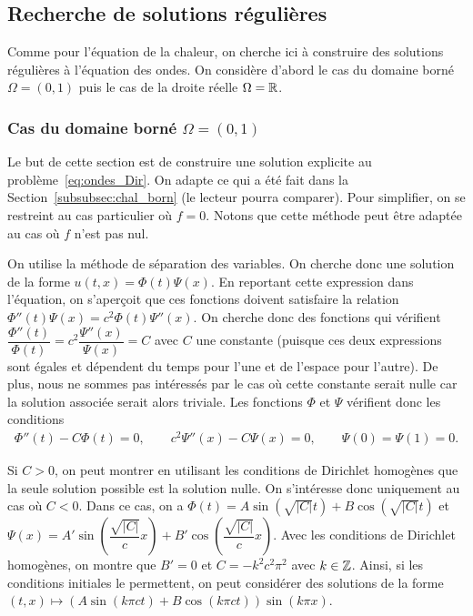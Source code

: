 \documentclass[12pt,a4paper,twoside]{article}
\begin{document}
\subsection{Recherche de solutions r\'eguli\`eres}

Comme pour l'\'equation de la chaleur, on cherche ici \`a construire des solutions
r\'eguli\`eres \`a l'\'equation des ondes.
On consid\`ere d'abord le cas du domaine born\'e $\Omega = (0,1)$
puis le cas de la droite r\'eelle $\Omega = \mathbb{R}$.

\subsubsection{Cas du domaine born\'e $\Omega = (0,1)$}

Le but de cette section est de construire une solution explicite au
probl\`eme~\eqref{eq:ondes_Dir}.
On adapte ce qui a \'et\'e fait dans la Section~\ref{subsubsec:chal_born}
(le lecteur pourra comparer).
Pour simplifier, on se restreint au cas particulier o\`u $f = 0$.
Notons que cette m\'ethode peut \^etre adapt\'ee au cas o\`u $f$ n'est pas nul.

On utilise la m\'ethode de s\'eparation des variables.
On cherche donc une solution de la forme $u(t,x) = \Phi(t) \Psi(x)$.
En reportant cette expression dans l'\'equation, on s'aper\c{c}oit 
que ces fonctions doivent satisfaire la relation
$\Phi''(t) \Psi(x) = c^2 \Phi(t) \Psi''(x)$.
On cherche donc des fonctions qui v\'erifient
$\dfrac{\Phi''(t)}{\Phi(t)} = c^2 \dfrac{\Psi''(x)}{\Psi(x)} = C$
avec $C$ une constante (puisque ces deux expressions sont \'egales 
et d\'ependent du temps pour l'une et de l'espace pour l'autre).
De plus, nous ne sommes pas int\'eress\'es par le cas o\`u cette
constante serait nulle car la solution associ\'ee serait alors triviale.
Les fonctions $\Phi$ et $\Psi$ v\'erifient donc les conditions
\begin{align*}
  \Phi''(t) - C \Phi(t) = 0 , 
  \qquad
  c^2 \Psi''(x) - C \Psi(x) = 0 ,
  \qquad
  \Psi(0) = \Psi(1) = 0 .
\end{align*}

Si $C > 0$, on peut montrer en utilisant les conditions de Dirichlet homog\`enes
que la seule solution possible est la solution nulle.
On s'int\'eresse donc uniquement au cas o\`u $C < 0$.
Dans ce cas, on a $\Phi(t) = A \sin(\sqrt{|C|} t) + B \cos(\sqrt{|C|} t)$
et $\Psi(x) = A' \sin(\dfrac{\sqrt{|C|}}{c} x) + B' \cos(\dfrac{\sqrt{|C|}}{c} x)$.
Avec les conditions de Dirichlet homog\`enes, on montre
que $B' = 0$ et $C = - k^2 c^2 \pi^2$ avec $k \in \mathbb{Z}$.
Ainsi, si les conditions initiales le permettent, on peut consid\'erer
des solutions de la forme
$(t,x) \mapsto (A \sin(k\pi c t) + B \cos(k\pi c t)) \sin(k \pi x)$.
\end{document}
